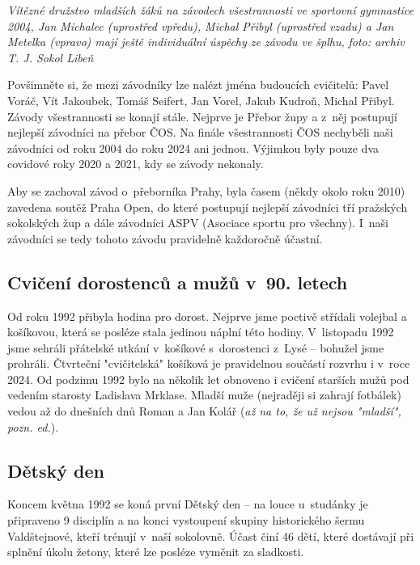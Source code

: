 \documentclass[a5paper, 11pt, twoside]{article}
\begin{document}
\textit{Vítězné družstvo mladších žáků na závodech všestrannosti ve
sportovní gymnastice 2004, Jan Michalec (uprostřed vpředu), Michal
Přibyl (uprostřed vzadu) a Jan Metelka (vpravo) mají ještě individuální
úspěchy ze závodu ve šplhu,} \textit{foto: archiv T. J. Sokol Libeň}

Povšimněte si, že mezi závodníky lze nalézt jména budoucích cvičitelů:
Pavel Voráč, Vít Jakoubek, Tomáš Seifert, Jan Vorel, Jakub Kudroň,
Michal Přibyl. Závody všestrannosti se konají stále. Nejprve je Přebor
župy a z~něj postupují nejlepší závodníci na přebor ČOS. Na finále
všestrannosti ČOS nechyběli naši závodníci od roku 2004 do roku 2024 ani
jednou. Výjimkou byly pouze dva covidové roky 2020 a 2021, kdy se závody
nekonaly.

Aby se zachoval závod o~přeborníka Prahy, byla časem (někdy okolo roku
2010) zavedena soutěž Praha Open, do které postupují nejlepší závodníci
tří pražských sokolských žup a dále závodníci ASPV (Asociace sportu pro
všechny). I~naši závodníci se tedy tohoto závodu pravidelně každoročně
účastní.

\subsection{Cvičení dorostenců a mužů v~90.
letech}

Od roku 1992 přibyla hodina pro dorost. Nejprve jsme poctivě střídali
volejbal a košíkovou, která se posléze stala jedinou náplní této hodiny.
V~listopadu 1992 jsme sehráli přátelské utkání v~košíkové s~dorostenci
z~Lysé -- bohužel jsme prohráli. Čtvrteční "cvičitelská" košíková je
pravidelnou součástí rozvrhu i v~roce 2024. Od podzimu 1992 bylo na
několik let obnoveno i cvičení starších mužů pod vedením starosty
Ladislava Mrklase. Mladší muže (nejraději si zahrají fotbálek) vedou až
do dnešních dnů Roman a Jan Kolář (\textit{až na to, že už nejsou
"mladší", pozn. ed.}).

\subsection{Dětský den}

Koncem května 1992 se koná první Dětský den -- na louce u~studánky je
připraveno 9 disciplín a na konci vystoupení skupiny historického šermu
Valdštejnové, kteří trénují v~naší sokolovně. Účast činí 46 dětí, které
dostávají při splnění úkolu žetony, které lze posléze vyměnit za
sladkosti.
\end{document}
